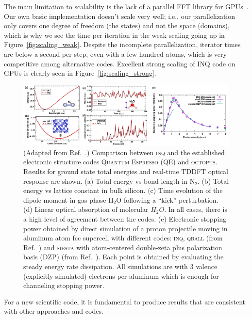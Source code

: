 The main limitation to scalability is the lack of a parallel FFT library for GPUs~\cite{Ayala2020}. 
Our own basic implementation doesn't scale very well; i.e., our parallelization only covers one degree of freedom (the states) and not the space (domains), which is why we see the time per iteration in the weak scaling going up in Figure~\ref{fig:scaling_weak}.
Despite the incomplete parallelization, iterator times are below a second per step, even with a few hundred atoms, which is very competitive among alternative codes.
Excellent strong scaling of INQ code on GPUs  is clearly seen in Figure~\ref{fig:scaling_strong}. 
\begin{figure}[h]
	\centering
	\includegraphics[width=1.0\linewidth]{figures/Results-Fig.pdf}
	\caption{%
		(Adapted from Ref.~\cite{Andrade2021}.) 
		Comparison between \textsc{inq} and the established electronic structure codes \textsc{Quantum Espresso} (QE) and \textsc{octopus}.
Results for ground state total energies and real-time TDDFT optical response are shown. 
		(a) Total energy vs bond length in \(\mathrm{N_2}\).
		(b) Total energy vs lattice constant in bulk silicon. 
		(c) Time evolution of the dipole moment in gas phase \(\mathrm{H_2O}\) following a ``kick'' perturbation. 
		(d) Linear optical absorption of molecular \(H_2O\). 
		In all cases, there is a high level of agreement between the codes.
		(e) Electronic stopping power obtained by direct simulation of a proton projectile moving in aluminum atom fcc supercell with different codes: \textsc{inq}, \textsc{qball} (from Ref.~\cite{Schleife2015}) and \textsc{siesta} with atom-centered double-zeta plus polarization basis (DZP) (from Ref.~\cite{Correa2012}).
		Each point is obtained by evaluating the steady energy rate dissipation.
		All simulations are with 3 valence (explicitly simulated) electrons per aluminum which is enough for channeling stopping power.
	}
	\label{fig:inq_results}
\end{figure}
\newline
{} For a new scientific code, it is fundamental to produce results that are consistent with other approaches and codes. 
